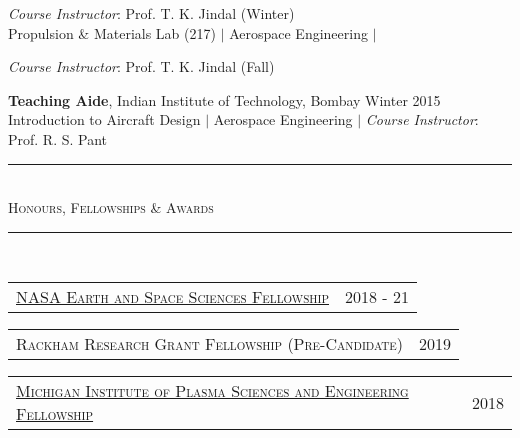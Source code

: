 \documentclass[10pt]{article}
\begin{document}
\normalsize{\emph{Course Instructor}: Prof. T. K. Jindal (Winter)\\
Propulsion \& Materials Lab (217) $|$ Aerospace Engineering $|$
\normalsize{\emph{Course Instructor}: Prof. T. K. Jindal (Fall)

\vspace{0.35em}
\textbf{Teaching Aide}, {{Indian Institute of Technology, Bombay}} \hfill Winter 2015 \\ 
Introduction to Aircraft Design $|$ Aerospace Engineering $|$
\normalsize{\emph{Course Instructor}: Prof. R. S. Pant}

\vspace{-0.5em}



\begin{center}
{\noindent\rule[0.5ex]{\linewidth}{0.5pt}\\
\vspace{-0.5em}\large{\textsc{Honours, Fellowships \& Awards}}\\
\vspace{-0.25em}
\noindent\rule[0.5ex]{\linewidth}{0.5pt}}\\
\end{center}

\vspace{-0.85em}
\begin{tabular}{p{15cm} p{4cm}}
\href{http://clasp.engin.umich.edu/articles/view/890#.Ww3ySUgvw2x}{\textsc{\normalsize{NASA Earth and Space Sciences Fellowship}}} & \normalsize{2018 - 21}
\end{tabular}

\begin{tabular}{p{15.75cm} p{3.25cm}}
{\textsc{\normalsize{Rackham Research Grant Fellowship (Pre-Candidate)}}} & \normalsize{2019}
\end{tabular}



\begin{tabular}{p{15.75cm} p{3.25cm}}
\href{http://mipse.umich.edu/fellowships.php}{\textsc{\normalsize{Michigan Institute of Plasma Sciences and Engineering Fellowship}}} & \normalsize{2018}
\end{tabular}

}}
\end{document}

